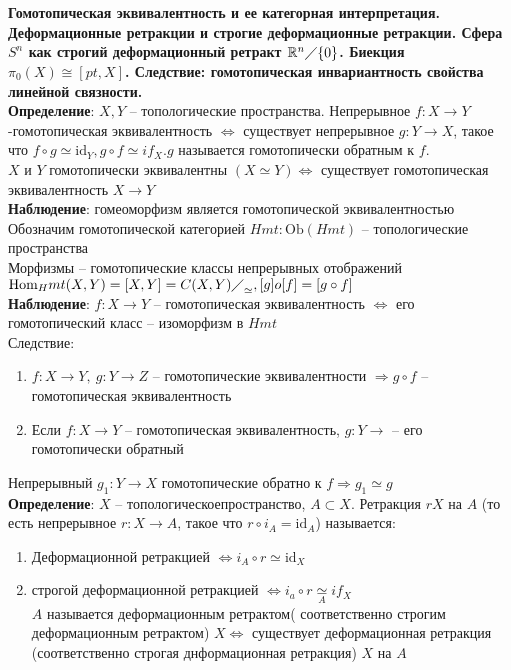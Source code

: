 \section{}	
	\textbf{Гомотопическая эквивалентность и ее категорная интерпретация. Деформационные ретракции и строгие деформационные ретракции. Сфера $S^n$ как строгий деформационный ретракт $\mathbb{R}^n \diagup \{0\}$. Биекция ${\pi}_0 (X) \cong [pt, X]$. Следствие: гомотопическая инвариантность свойства линейной связности.}\\
	\textbf{Определение}: $X, Y$ -- топологические пространства. Непрерывное $f: X \rightarrow Y$ -гомотопическая эквивалентность $\Leftrightarrow$ существует непрерывное $g: Y \rightarrow X$, такое что $f \circ g \simeq  \text{id}_Y, g \circ f \simeq if_X. g$ называется гомотопически обратным к $f$.\\
	$X$ и $Y$ гомотопически эквивалентны $(X\simeq Y) \Leftrightarrow$ существует гомотопическая эквивалентность $X\rightarrow Y$\\
	\textbf{Наблюдение}: гомеоморфизм является гомотопической эквивалентностью\\
	Обозначим гомотопической категорией $Hmt: \text{Ob}(Hmt)$ -- топологические пространства\\
	Морфизмы -- гомотопические классы непрерывных отображений $\text{Hom}_Hmt (X,Y) = [X,Y] = {C(X,Y)\diagup}_{\simeq}, [g]o[f] = [g \circ f]$\\
	\textbf{Наблюдение}: $f: X\rightarrow Y$ -- гомотопическая эквивалентность $\Leftrightarrow$ его гомотопический класс -- изоморфизм в $Hmt$\\
	Следствие: 
	\begin{enumerate}
	\item $f: X\rightarrow Y,\ g: Y \rightarrow Z$ -- гомотопические эквивалентности $\Rightarrow g \circ f$ -- гомотопическая эквивалентность
	\item Если $f: X\rightarrow Y$ -- гомотопическая эквивалентность, $g: Y\rightarrow$ -- его гомотопически обратный	
	\end{enumerate}
	Непрерывный $g_1: Y \rightarrow X$ гомотопические обратно к $f \Rightarrow g_1 \simeq g$\\
	\textbf{Определение}: $X$ -- топологическоепространство, $A\subset X$. Ретракция $r X$ на $A$ (то есть непрерывное $r: X\rightarrow A$, такое что $r \circ i_A =  \text{id}_A$) называется:\\
	\begin{enumerate}
	\item Деформационной ретракцией $\Leftrightarrow i_A \circ r \simeq  \text{id}_X$
		\begin{figure}[h]
		\end{figure}
	\item строгой деформационной ретракцией $\Leftrightarrow i_a \circ r \underset{A}{\simeq} if_X$\\
		$A$ называется деформационным ретрактом( соответственно строгим деформационным ретрактом) $X \Leftrightarrow$ существует деформационная ретракция (соответственно строгая днформационная ретракция) $X$ на $A$
	\end{enumerate}
